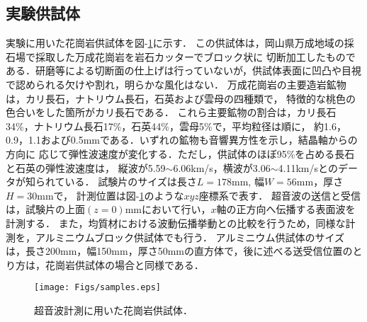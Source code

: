 ﻿%
\subsection{実験供試体}
実験に用いた花崗岩供試体を図-\ref{fig:fig1}に示す．
この供試体は，岡山県万成地域の採石場で採取した万成花崗岩を岩石カッターでブロック状に
切断加工したものである．研磨等による切断面の仕上げは行っていないが，供試体表面に凹凸や目視で認められる欠けや割れ，明らかな風化はない．
万成花崗岩の主要造岩鉱物は，カリ長石，ナトリウム長石，石英および雲母の四種類で，
特徴的な桃色の色合いをした箇所がカリ長石である．
これら主要鉱物の割合は，カリ長石34\%，ナトリウム長石17\%，石英44\%，雲母5\%で，平均粒径は順に，
約1.6，0.9，1.1および0.5mmである．いずれの鉱物も音響異方性を示し，結晶軸からの方向に
応じて弾性波速度が変化する．ただし，供試体のほぼ95\%を占める長石と石英の弾性波速度は，
縦波が5.59$\sim$6.06km/s，横波が3.06$\sim$4.11km/sとのデータが知られている\cite{RockPhys}．
試験片のサイズは長さ$L=178$mm, 幅$W=56$mm，厚さ$H=30$mmで，
計測位置は図-\ref{fig:fig1}のような$xyz$座標系で表す．
超音波の送信と受信は，試験片の上面$(z=0)$mmにおいて行い，$x$軸の正方向へ伝播する表面波を計測する．
また，均質材における波動伝播挙動との比較を行うため，同様な計測を，アルミニウムブロック供試体でも行う．
アルミニウム供試体のサイズは，長さ200mm，幅150mm，厚さ50mmの直方体で，後に述べる送受信位置のとり方は，花崗岩供試体の場合と同様である．
\begin{figure}
\begin{center}
\texttt{[image: Figs/samples.eps]}
\caption{
	超音波計測に用いた花崗岩供試体．
}
\label{fig:fig1}
\end{center}
	\vspace{-5mm}
\end{figure}
